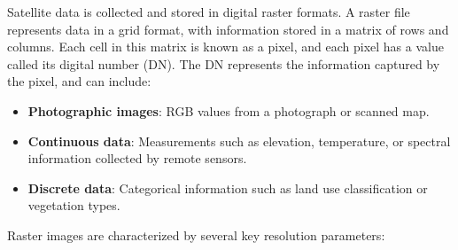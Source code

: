 \documentclass[
  12 pt,
]{Nemilov}
\providecommand{\tightlist}{%
  \setlength{\itemsep}{0pt}\setlength{\parskip}{0pt}}
\begin{document}
Satellite data is collected and stored in digital raster formats. A raster file represents data in a grid format, with information stored in a matrix of rows and columns. Each cell in this matrix is known as a pixel, and each pixel has a value called its digital number (DN). The DN represents the information captured by the pixel, and can include:

\begin{itemize}
\tightlist
\item
  \textbf{Photographic images}: RGB values from a photograph or scanned map.
\item
  \textbf{Continuous data}: Measurements such as elevation, temperature, or spectral information collected by remote sensors.
\item
  \textbf{Discrete data}: Categorical information such as land use classification or vegetation types.
\end{itemize}

Raster images are characterized by several key resolution parameters:
\end{document}
